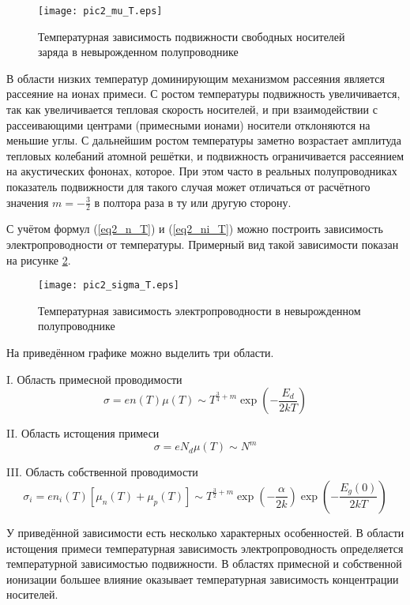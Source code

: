 \begin{figure}[h!]\centering
\texttt{[image: pic2\_mu\_T.eps]}
\caption{Температурная зависимость подвижности свободных носителей заряда в невырожденном полупроводнике}
\label{pic2_mu_T}
\end{figure}

В области низких температур доминирующим механизмом рассеяния является рассеяние на ионах примеси. С ростом температуры подвижность увеличивается, так как увеличивается тепловая скорость носителей, и при взаимодействии с рассеивающими центрами (примесными ионами) носители отклоняются на меньшие углы. С дальнейшим ростом температуры заметно возрастает амплитуда тепловых колебаний атомной решётки, и подвижность ограничивается рассеянием на акустических фононах, которое. При этом часто в реальных полупроводниках показатель подвижности для такого случая может отличаться от расчётного значения $m = -\frac{3}{2}$ в полтора раза в ту или другую сторону.

С учётом формул (\ref{eq2_n_T}) и (\ref{eq2_ni_T}) можно построить зависимость электропроводности от температуры. Примерный вид такой зависимости показан на рисунке \ref{pic2_sigma_T}.

\begin{figure}[h!]\centering
\texttt{[image: pic2\_sigma\_T.eps]}
\caption{Температурная зависимость электропроводности в невырожденном полупроводнике}
\label{pic2_sigma_T}
\end{figure}

На приведённом графике можно выделить три области.

I. Область примесной проводимости
\begin{equation}
\sigma = e n(T) \mu(T) \sim T^{\frac{3}{4} + m} \exp{\left( -\frac{E_{d}}{2 k T} \right)}
\end{equation}

II. Область истощения примеси
\begin{equation}
\sigma = e N_{d} \mu(T) \sim N^{m}
\end{equation}

III. Область собственной проводимости
\begin{equation}
\sigma_{i} = e n_{i}(T) \left[ \mu_{n}(T) + \mu_{p}(T) \right] \sim T^{\frac{3}{2} + m} \exp{\left( -\frac{\alpha}{2 k} \right)} \exp{\left( -\frac{E_{g}(0)}{2 k T} \right)}
\end{equation}

У приведённой зависимости есть несколько характерных особенностей. В области истощения примеси температурная зависимость электропроводность определяется температурной зависимостью подвижности. В областях примесной и собственной ионизации большее влияние оказывает температурная зависимость концентрации носителей.

